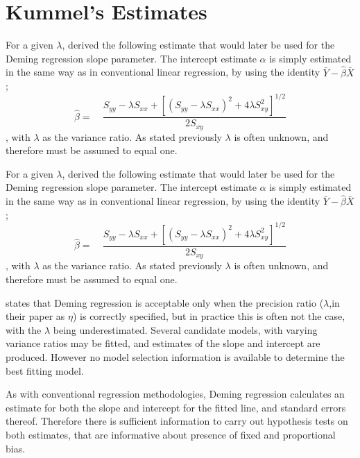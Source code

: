 \documentclass[12pt, a4paper]{report}
\theoremstyle{plain}
\theoremstyle{definition}
\theoremstyle{remark}
\begin{document}
\newpage



\section{Kummel's Estimates}
For a given $\lambda$, \citet{Kummel} derived the following estimate that would later be used for the Deming regression slope
parameter. The intercept estimate $\alpha$ is simply estimated in the same way as in conventional linear
regression, by using the identity $\bar{Y}-\hat{\beta}\bar{X}$;
\begin{equation}
	\hat{\beta} =\quad \frac{S_{yy} - \lambda S_{xx}+[(S_{yy} -
		\lambda S_{xx})^{2}+ 4\lambda S^{2}_{xy}]^{1/2}}{2S_{xy}}
\end{equation},
with $\lambda$ as the variance ratio. As stated previously $\lambda$ is often unknown, and therefore must be assumed to equal one. 

For a given $\lambda$, \citet{Kummel} derived the following estimate that would later be used for the Deming regression slope
parameter. The intercept estimate $\alpha$ is simply estimated in the same way as in conventional linear
regression, by using the identity $\bar{Y}-\hat{\beta}\bar{X}$;
\begin{equation}
	\hat{\beta} =\quad \frac{S_{yy} - \lambda S_{xx}+[(S_{yy} -
		\lambda S_{xx})^{2}+ 4\lambda S^{2}_{xy}]^{1/2}}{2S_{xy}}
\end{equation},
with $\lambda$ as the variance ratio. As stated previously $\lambda$ is often unknown, and therefore must be assumed to equal one. 

\citet{CarollRupert} states that Deming
regression is acceptable only when the precision ratio ($\lambda$,in their paper as $\eta$) is correctly specified, but in practice this is often not the case, with the $\lambda$ being underestimated. Several candidate models, with varying variance ratios may be fitted, and estimates of the slope and intercept are produced. However no model selection information is available to determine the best fitting model.

As with conventional regression methodologies, Deming regression calculates an estimate for both the slope and intercept for the
fitted line, and standard errors thereof. Therefore there is sufficient information to carry out hypothesis tests on both
estimates, that are informative about presence of fixed and proportional bias.
\end{document}
